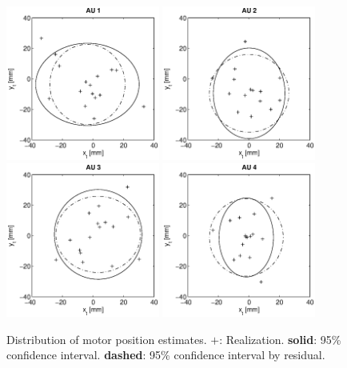 \begin{figure}[hbtp]
\centering
\includegraphics[width = 0.45\textwidth]{images/results/confidence_95_interval_AU1.eps}
\includegraphics[width = 0.45\textwidth]{images/results/confidence_95_interval_AU2.eps} \\
\includegraphics[width = 0.45\textwidth]{images/results/confidence_95_interval_AU3.eps}
\includegraphics[width = 0.45\textwidth]{images/results/confidence_95_interval_AU4.eps}
\caption{Distribution of motor position estimates. $\mathbf{+}$: Realization. \textbf{solid}: 95\% confidence interval. \textbf{dashed}: 95\% confidence interval by residual.}
\label{fig:result_95pc_confidence}
\end{figure}



